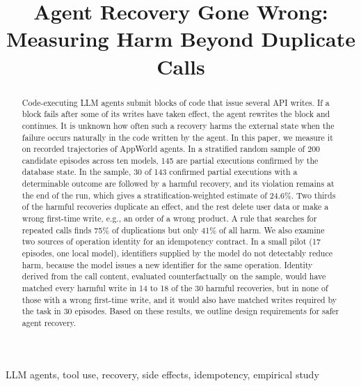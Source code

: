 \documentclass[conference]{IEEEtran}
\begin{document}
\title{Agent Recovery Gone Wrong: Measuring Harm Beyond Duplicate Calls}

\author{
\and
{}
}

\maketitle
{}

\begin{abstract}
Code-executing LLM agents submit blocks of code that issue several API writes. If a block fails after some of its writes have taken effect, the agent rewrites the block and continues. It is unknown how often such a recovery harms the external state when the failure occurs naturally in the code written by the agent. In this paper, we measure it on recorded trajectories of AppWorld agents. In a stratified random sample of 200 candidate episodes across ten models, 145 are partial executions confirmed by the database state. In the sample, 30 of 143 confirmed partial executions with a determinable outcome are followed by a harmful recovery, and its violation remains at the end of the run, which gives a stratification-weighted estimate of 24.6\%. Two thirds of the harmful recoveries duplicate an effect, and the rest delete user data or make a wrong first-time write, e.g., an order of a wrong product. A rule that searches for repeated calls finds 75\% of duplications but only 41\% of all harm. We also examine two sources of operation identity for an idempotency contract. In a small pilot (17 episodes, one local model), identifiers supplied by the model do not detectably reduce harm, because the model issues a new identifier for the same operation. Identity derived from the call content, evaluated counterfactually on the sample, would have matched every harmful write in 14 to 18 of the 30 harmful recoveries, but in none of those with a wrong first-time write, and it would also have matched writes required by the task in 30 episodes. Based on these results, we outline design requirements for safer agent recovery.
\end{abstract}

\begin{IEEEkeywords}
LLM agents, tool use, recovery, side effects, idempotency, empirical study
\end{IEEEkeywords}
\end{document}
